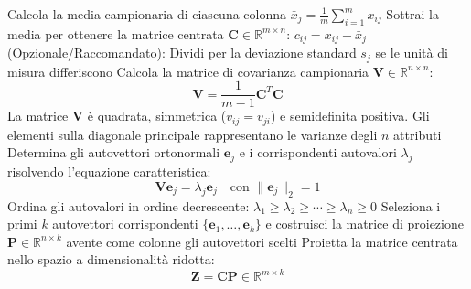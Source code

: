 \begin{algorithm}[H]
\caption{Calcolo delle Componenti Principali (PCA)}
\BlankLine
{}
Calcola la media campionaria di ciascuna colonna $\bar{x}_j = \frac{1}{m}\sum_{i=1}^m x_{ij}$\;
Sottrai la media per ottenere la matrice centrata $\mathbf{C} \in \mathbb{R}^{m \times n}$: $c_{ij} = x_{ij} - \bar{x}_j$\;
(Opzionale/Raccomandato): Dividi per la deviazione standard $s_j$ se le unità di misura differiscono\;
\BlankLine
{}
Calcola la matrice di covarianza campionaria $\mathbf{V} \in \mathbb{R}^{n \times n}$:
\begin{equation}
\mathbf{V} = \frac{1}{m-1}\mathbf{C}^T\mathbf{C}
\end{equation}
La matrice $\mathbf{V}$ è quadrata, simmetrica ($v_{ij} = v_{ji}$) e semidefinita positiva. Gli elementi sulla diagonale principale rappresentano le varianze degli $n$ attributi\;
\BlankLine
{}
Determina gli autovettori ortonormali $\mathbf{e}_j$ e i corrispondenti autovalori $\lambda_j$ risolvendo l'equazione caratteristica:
\begin{equation}
\mathbf{V}\mathbf{e}_j = \lambda_j \mathbf{e}_j \quad \text{con } \|\mathbf{e}_j\|_2 = 1
\end{equation}
\BlankLine
{}
Ordina gli autovalori in ordine decrescente: $\lambda_1 \ge \lambda_2 \ge \cdots \ge \lambda_n \ge 0$\;
Seleziona i primi $k$ autovettori corrispondenti $\{\mathbf{e}_1, \dots, \mathbf{e}_k\}$ e costruisci la matrice di proiezione $\mathbf{P} \in \mathbb{R}^{n \times k}$ avente come colonne gli autovettori scelti\;
\BlankLine
{}
Proietta la matrice centrata nello spazio a dimensionalità ridotta:
\begin{equation}
\mathbf{Z} = \mathbf{C}\mathbf{P} \in \mathbb{R}^{m \times k}
\end{equation}
\end{algorithm}

